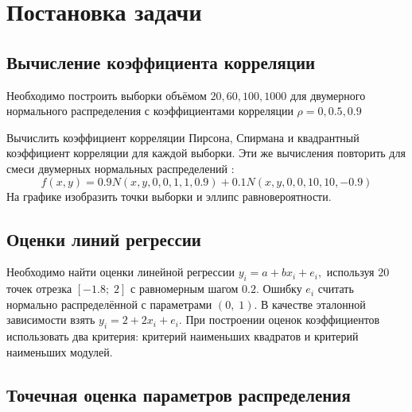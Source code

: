 \documentclass[a4]{article}
\renewcommand{\listoffigures}{\begingroup %
\tocsection
\tocfile{\listfigurename}{lof}
\endgroup}
\renewcommand{\listoftables}{\begingroup %
\tocsection
\tocfile{\listtablename}{lot}
\endgroup}
\begin{document}
\newpage
\pagestyle{plain}




\newpage
\tableofcontents{}
\newpage
\listoffigures{}
\listoftables{}
\newpage

\section{Постановка задачи}

\subsection{Вычисление коэффициента корреляции}

Необходимо построить выборки объёмом $20, 60, 100, 1000$ для двумерного нормального распределения с коэффициентами корреляции $\rho = 0, 0.5, 0.9$

Вычислить коэффициент корреляции Пирсона, Спирмана и квадрантный коэффициент корреляции для каждой выборки. Эти же вычисления повторить для смеси двумерных нормальных распределений \cite{mix}: 
\begin{equation}
    f(x,y) = 0.9N(x,y,0,0,1,1,0.9)+0.1N(x,y,0,0,10,10,-0.9)
\end{equation}
На графике изобразить точки выборки и эллипс равновероятности.

\subsection{Оценки линий регрессии}
Необходимо найти оценки линейной регрессии $y_i=a+bx_i+e_i,$ используя $20$ точек отрезка $[-1.8;\;2]$ с равномерным шагом $0.2.$ Ошибку $e_i$ считать нормально распределённой с параметрами $(0,\;1).$ В качестве эталонной зависимости взять $y_i=2+2x_i+e_i.$ При построении оценок коэффициентов использовать два критерия: критерий наименьших квадратов и критерий наименьших модулей.

\subsection{Точечная оценка параметров распределения}
\end{document}

